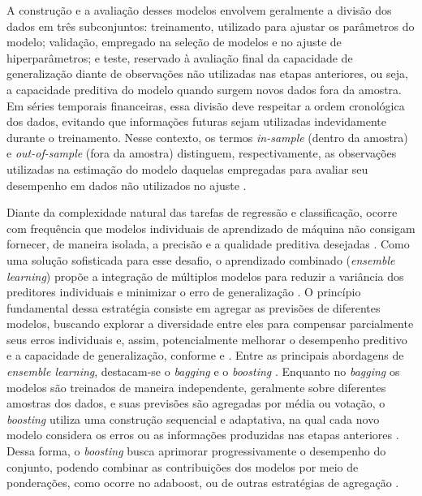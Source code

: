 A construção e a avaliação desses modelos envolvem geralmente a divisão dos dados em três subconjuntos: treinamento, utilizado para ajustar os parâmetros do modelo; validação, empregado na seleção de modelos e no ajuste de hiperparâmetros; e teste, reservado à avaliação final da capacidade de generalização diante de observações não utilizadas nas etapas anteriores, ou seja, a capacidade preditiva do modelo quando surgem novos dados fora da amostra. Em séries temporais financeiras, essa divisão deve respeitar a ordem cronológica dos dados, evitando que informações futuras sejam utilizadas indevidamente durante o treinamento. Nesse contexto, os termos \textit{in-sample} (dentro da amostra) e \textit{out-of-sample} (fora da amostra) distinguem, respectivamente, as observações utilizadas na estimação do modelo daquelas empregadas para avaliar seu desempenho em dados não utilizados no ajuste \cite{sebastiao2021forecasting,derbentsev2021comparative}.

Diante da complexidade natural das tarefas de regressão e classificação, ocorre com frequência que modelos individuais de aprendizado de máquina não consigam fornecer, de maneira isolada, a precisão e a qualidade preditiva desejadas \cite{derbentsev2021comparative}. Como uma solução sofisticada para esse desafio, o aprendizado combinado (\textit{ensemble learning}) propõe a integração de múltiplos modelos para reduzir a variância dos preditores individuais e minimizar o erro de generalização \cite{livieris2020ensemble}. O princípio fundamental dessa estratégia consiste em agregar as previsões de diferentes modelos, buscando explorar a diversidade entre eles para compensar parcialmente seus erros individuais e, assim, potencialmente melhorar o desempenho preditivo e a capacidade de generalização, conforme  e . Entre as principais abordagens de \textit{ensemble learning}, destacam-se o \textit{bagging} e o \textit{boosting} \cite{park2023intelligent}. Enquanto no \textit{bagging} os modelos são treinados de maneira independente, geralmente sobre diferentes amostras dos dados, e suas previsões são agregadas por média ou votação, o \textit{boosting} utiliza uma construção sequencial e adaptativa, na qual cada novo modelo considera os erros ou as informações produzidas nas etapas anteriores \cite{derbentsev2021comparative,park2023intelligent}. Dessa forma, o \textit{boosting} busca aprimorar progressivamente o desempenho do conjunto, podendo combinar as contribuições dos modelos por meio de ponderações, como ocorre no \acf{adaboost}, ou de outras estratégias de agregação \cite{derbentsev2021comparative,park2023intelligent}.

